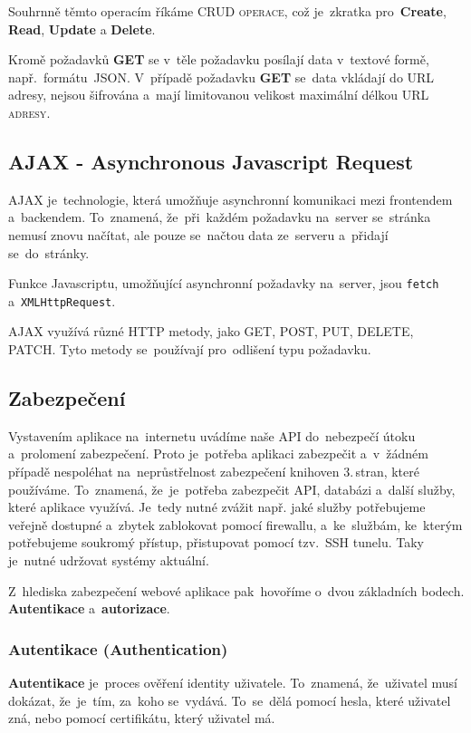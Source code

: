 \documentclass[14pt,a4paper]{article}
\begin{document}
        Souhrnně těmto operacím říkáme \textsc{CRUD operace}, což je~zkratka pro~\textbf{Create}, \textbf{Read}, \textbf{Update} a \textbf{Delete}.

        Kromě požadavků \textbf{GET} se v~těle požadavku posílají data v~textové formě, např.~formátu~JSON. 
        V~případě požadavku \textbf{GET} se~data vkládají do URL adresy, nejsou šifrována a~mají limitovanou velikost maximální délkou \textsc{URL adresy}.

        \subsection{AJAX - Asynchronous Javascript Request}
        AJAX je~technologie, která umožňuje asynchronní komunikaci mezi frontendem a~backendem.
        To~znamená, že~při~každém požadavku na~server se~stránka nemusí znovu načítat, ale pouze se~načtou data ze~serveru a~přidají se~do~stránky.

        Funkce Javascriptu, umožňující asynchronní požadavky na~server, jsou \texttt{fetch} a~\texttt{XMLHttpRequest}.

        AJAX využívá různé HTTP metody, jako GET, POST, PUT, DELETE, PATCH. Tyto metody se~používají pro~odlišení typu požadavku.\parencite{ajax:mdn}

        \subsection{Zabezpečení}
        Vystavením aplikace na~internetu uvádíme naše API do~nebezpečí útoku a~prolomení zabezpečení. Proto je~potřeba aplikaci zabezpečit a~v~žádném případě nespoléhat na~neprůstřelnost zabezpečení knihoven 3.\,stran, které používáme.
        To~znamená, že~je~potřeba zabezpečit API, databázi a~další služby, které aplikace využívá. Je~tedy nutné zvážit např. jaké služby potřebujeme veřejně dostupné a~zbytek zablokovat pomocí firewallu, a~ke~službám, ke~kterým potřebujeme soukromý přístup, přistupovat pomocí tzv.~SSH tunelu. Taky je~nutné udržovat systémy aktuální.

        Z~hlediska zabezpečení webové aplikace pak~hovoříme o~dvou základních bodech. \textbf{Autentikace} a~\textbf{autorizace}.

            \subsubsection{Autentikace (Authentication)}
            \textbf{Autentikace} je~proces ověření identity uživatele. To~znamená, že~uživatel musí dokázat, že~je~tím, za~koho se~vydává.
            To~se~dělá pomocí hesla, které uživatel zná, nebo pomocí certifikátu, který uživatel má.
\end{document}
